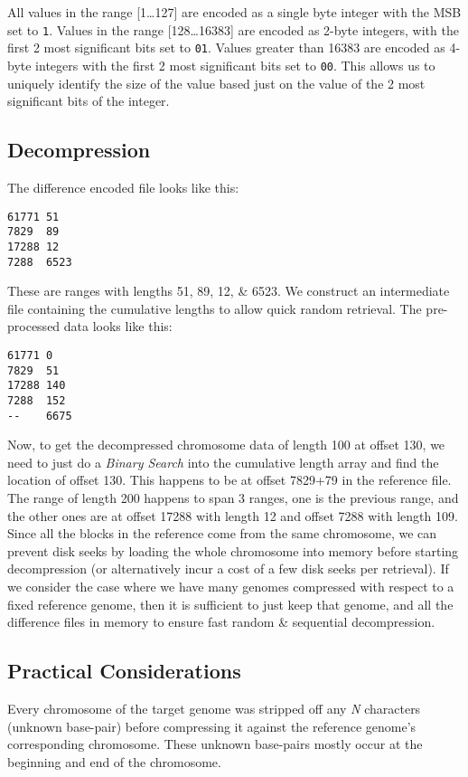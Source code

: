 \documentclass[11pt]{article}
\begin{document}
All values in the range [1\ldots{}127] are encoded as a single byte
integer with the MSB set to \texttt{1}. Values in the range
[128\ldots{}16383] are encoded as 2-byte integers, with the first 2
most significant bits set to \texttt{01}. Values greater than 16383
are encoded as 4-byte integers with the first 2 most significant bits
set to \texttt{00}. This allows us to uniquely identify the size of
the value based just on the value of the 2 most significant bits of
the integer.

\subsection{Decompression}

The difference encoded file looks like this:
\begin{verbatim}
61771 51
7829  89
17288 12
7288  6523
\end{verbatim}

These are ranges with lengths 51, 89, 12, \& 6523. We construct an
intermediate file containing the cumulative lengths to allow quick
random retrieval. The pre-processed data looks like this:

\begin{verbatim}
61771 0
7829  51
17288 140
7288  152
--    6675
\end{verbatim}

Now, to get the decompressed chromosome data of length 100 at offset
130, we need to just do a \textit{Binary Search} into the cumulative
length array and find the location of offset 130. This happens to be
at offset 7829+79 in the reference file. The range of length 200
happens to span 3 ranges, one is the previous range, and the other
ones are at offset 17288 with length 12 and offset 7288 with length
109. Since all the blocks in the reference come from the same
chromosome, we can prevent disk seeks by loading the whole chromosome
into memory before starting decompression (or alternatively incur a
cost of a few disk seeks per retrieval). If we consider the case where
we have many genomes compressed with respect to a fixed reference
genome, then it is sufficient to just keep that genome, and all the
difference files in memory to ensure fast random \& sequential
decompression.


\subsection{Practical Considerations}

Every chromosome of the target genome was stripped off any \textit{N}
characters (unknown base-pair) before compressing it against the
reference genome's corresponding chromosome. These unknown base-pairs
mostly occur at the beginning and end of the chromosome.
\end{document}
